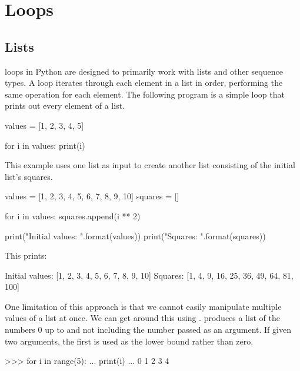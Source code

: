 \documentclass[11pt]{cselabheader}
\begin{document}
\pagebreak
\section{\protect{} Loops}

\subsection{Lists}
 loops in Python are designed to primarily work with lists and
other sequence types. A  loop iterates through each element in
a list in order, performing the same operation for each element. The following
program is a simple  loop that prints out every element of a
list.

\begin{python3code}
values = [1, 2, 3, 4, 5]

for i in values:
    print(i)
\end{python3code}

This example uses one list as input to create another list consisting of the
initial list's squares.

\begin{python3code}
values = [1, 2, 3, 4, 5, 6, 7, 8, 9, 10]
squares = []

for i in values:
    squares.append(i ** 2)

print("Initial values: {}".format(values))
print("Squares: {}".format(squares))
\end{python3code}

This prints:

\begin{verbatimcode}
Initial values: [1, 2, 3, 4, 5, 6, 7, 8, 9, 10]
Squares: [1, 4, 9, 16, 25, 36, 49, 64, 81, 100]
\end{verbatimcode}

One limitation of this approach is that we cannot easily manipulate multiple
values of a list at once. We can get around this using .
 produces a list of the numbers 0 up to and not including the
number passed as an argument. If given two arguments, the first is used as the
lower bound rather than zero.

\begin{pyconcode}
>>> for i in range(5):
...   print(i)
...
0
1
2
3
4
\end{pyconcode}
\end{document}
